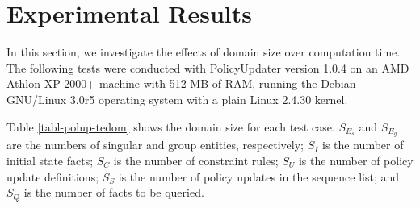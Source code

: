 \documentclass[11pt]{report}
\begin{document}
    \section{Experimental Results}
      \label{sect-polup-exper}

      In this section, we investigate the effects of domain size over
      computation time. The following tests  were conducted with PolicyUpdater
      version 1.0.4 on an AMD Athlon XP 2000+ machine with 512 MB of RAM,
      running the Debian GNU/Linux 3.0r5 operating system with a plain
      Linux 2.4.30 kernel.

      Table \ref{tabl-polup-tedom} shows the domain size for each test case.
      $S_{E_{s}}$ and $S_{E_{g}}$ are the numbers of singular and group
      entities, respectively; $S_{I}$ is the number of initial state facts;
      $S_{C}$ is the number of constraint rules; $S_{U}$ is the number of
      policy update definitions; $S_{S}$ is the number of policy updates in
      the sequence list; and $S_{Q}$ is the number of facts to be queried.
\end{document}
